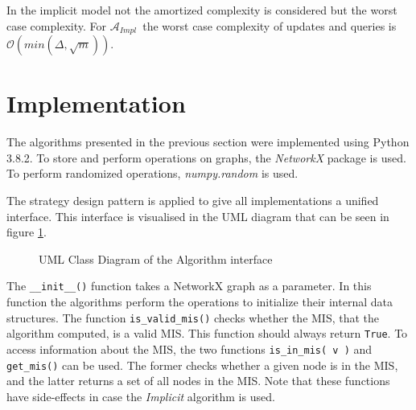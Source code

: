 \documentclass[letterpaper,11pt]{article}
\newcommand{\implicit}{$\mathcal{A}_{Impl}$\ }
\begin{document}
In the implicit model not the amortized complexity is considered but the worst
case complexity. For \implicit the worst case complexity of updates and
queries is $\mathcal{O}(min(\Delta, \sqrt{m}))$.





\section{Implementation}
\label{Implementation}

The algorithms presented in the previous section were implemented using Python
3.8.2. To store and perform operations on graphs, the \textit{NetworkX} package
is used. To perform randomized operations, \textit{numpy.random} is used.

The strategy design pattern is applied to give all implementations a unified
interface. This interface is visualised in the UML diagram that can be seen in
figure \ref{fig:uml}.

%
%

\begin{figure}[H]
  \begin{center}
  \end{center}
  \label{fig:uml}
  \caption{UML Class Diagram of the Algorithm interface}
\end{figure}

The \lstinline[]{__init__()} function takes a NetworkX graph as a parameter. In
this function the algorithms perform the operations to initialize their internal
data structures. The function \lstinline{is_valid_mis()} checks whether the MIS,
that the algorithm computed, is a valid MIS. This function should always return
\lstinline{True}. To access information about the MIS, the two functions
\lstinline{is_in_mis( v )} and \lstinline{get_mis()} can be used. The former
checks whether a given node is in the MIS, and the latter returns a set of all
nodes in the MIS. Note that these functions have side-effects in case the
\textit{Implicit} algorithm is used.
\end{document}
